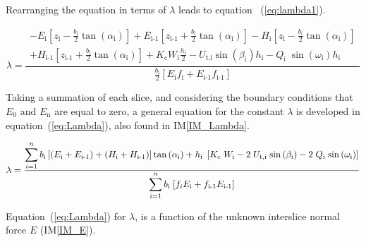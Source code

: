 \documentclass[12pt]{article}
\newcommand{\iref}[1]{IM\ref{#1}}
\begin{document}
\noindent
Rearranging the equation in terms of $\lambda$ leads to equation
~(\ref{eq:lambda1}).

\begin{equation}\label{eq:lambda1}
  \lambda = \frac { \begin{array}{l} - {E}_{\text{i}} \left[
        {z_{\text{i}}} - \frac{b_{\text{i}}}{2} {
          \tan\left(\alpha_{\text{i}}\right)} \right] +
      {E}_{\text{i-1}} \left[ {z_{\text{i-1}}} +
        \frac{b_{\text{i}}}{2} { \tan\left(\alpha_{\text{i}}\right)}
        \right] - H_{\text{i}}\left[ z_{\text{i}} -
        \frac{b_{\text{i}}}{2} { \tan\left(\alpha_{\text{i}}\right)}
        \right] \\[5pt] + H_{\text{i-1}}\left[ z_{\text{i-1}} +
        \frac{b_{\text{i}}}{2} { \tan\left(\alpha_{\text{i}}\right)}
        \right] + K_{\text{c}} W_{\text{i}} \frac{h_{\text{i}}}{2} -
      U_{\text{t,i}} \sin\left(\beta_{\text{i}}\right) h_{\text{i}} -
      Q_{\text{i}}\;{\sin\left(\omega_{\text{i}}\right)}
      h_{\text{i}} \end{array} } { \frac{b_{\text{i}}}{2} \left[
      E_{\text{i}} f_{\text{i}} + E_{\text{i-1}} f_{\text{i-1}}
      \right] }
\end{equation}

\noindent
Taking a summation of each slice, and considering the boundary
conditions that $E_{\text{0}}$ and $E_{\text{n}}$ are equal to zero, a
general equation for the constant $\lambda$ is developed in
equation~(\ref{eq:Lambda}), also found in \iref{IM_Lambda}.

\begin{equation}\label{eq:Lambda}
\lambda= \frac{ \displaystyle\sum_{i=1}^{n} { {b_{\text{i}}} \left[
      \left({{E}_{\text{i}} + {E}_{\text{i-1}}}\right) +
      \left({{H}_{\text{i}} + {H}_{\text{i-1}}}\right)
      \right]{\tan\left(\alpha_{\text{i}}\right)} \\ +
    {{h}_{\text{i}}}\;\left[ {K_{\text{c}}}\;{W_{\text{i}}} -
      {2}\;{U_{\text{t,i}}}\;{\sin\left(\beta_{\text{i}}\right)} - {2}
      \; Q_{\text{i}}\;{\sin\left(\omega_{\text{i}}\right)} \right] }}
         {\displaystyle\sum_{i=1}^{n} { {{b}_{\text{i}}}\;{\left[{
                   {f_{i}}{{E}_{\text{i}}} +
                   {f_{\text{i-1}}}{{E}_{\text{i-1}}} }\right]} }}
\end{equation}

\noindent
Equation~(\ref{eq:Lambda}) for $\lambda$, is a function of the unknown
interslice normal force $E$ (\iref{IM_E}).
\end{document}
